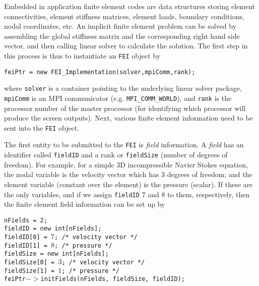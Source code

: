 Embedded in application finite element codes are data structures
storing element connectivities, element stiffness matrices, element
loads, boundary conditions, nodal coordinates, etc. An implicit finite
element problem can be solved by assembling the global stiffness matrix
and the corresponding right hand side vector, and then calling linear
solver to calculate the solution. The first step in this process is 
thus to instantiate an {\tt FEI} object by
\begin{tabbing}
\hspace{0.5in} \= {\tt feiPtr = new FEI\_Implementation(solver,mpiComm,rank);}
\end{tabbing}
where {\tt solver} is a container pointing to the underlying linear solver 
package, {\tt mpiComm} is an MPI communicator (e.g. {\tt MPI\_COMM\_WORLD}),
and {\tt rank} is the processor number of the master processor (for 
identifying which processor will produce the screen outputs). 
Next, various finite element information need to be sent into the {\tt FEI}
object.

The first entity to be submitted to the {\tt FEI} is {\it field} information. 
A {\it field} has an identifier called {\tt fieldID} and a rank or
{\tt fieldSize} (number of degrees of freedom). For example, for a simple
3D incompressible Navier Stokes equation, the nodal variable is the velocity
vector which has $3$ degrees of freedom; and the element variable (constant
over the element) is the pressure (scalar). If these are the only variables,
and if we assign {\tt fieldID} $7$ and $8$ to them, respectively, then the
finite element field information can be set up by
\begin{tabbing}
\hspace{0.5in} \= {\tt nFields = 2;} \\
               \> {\tt fieldID = new int[nFields];} \\
               \> {\tt fieldID[0] = $7$; /* velocity vector */} \\
               \> {\tt fieldID[1] = $8$; /* pressure */} \\
               \> {\tt fieldSize = new int[nFields];} \\
               \> {\tt fieldSize[0] = $3$; /* velocity vector */} \\
               \> {\tt fieldSize[1] = $1$; /* pressure */ } \\
               \> {\tt feiPtr$->$initFields(nFields, fieldSize, fieldID);}
\end{tabbing}

